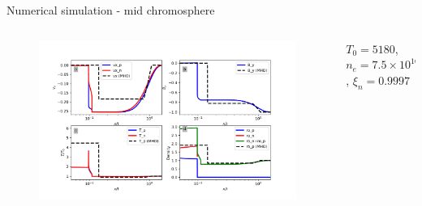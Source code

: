 \documentclass[10pt,aspectratio=169,usenames,dvipsnames]{beamer}
\begin{document}
\begin{frame}{Numerical simulation - mid chromosphere}
\begin{columns}
\begin{column}{0.8\textwidth}
\begin{figure}
    \includegraphics[width=0.95\linewidth,clip=true,trim=0.9cm 0.8cm 0.9cm 0.8cm]{2023ECRW/Figures/context_midc_corrected.png}
    \label{fig:upperchromocontext}
\end{figure}
\end{column}
\begin{column}{0.2\textwidth}
    $T_0=5180$, $n_e=7.5\times 10^{16}$, $\xi_n=0.9997$
\end{column}
\end{columns}
\end{frame}

\end{document}
